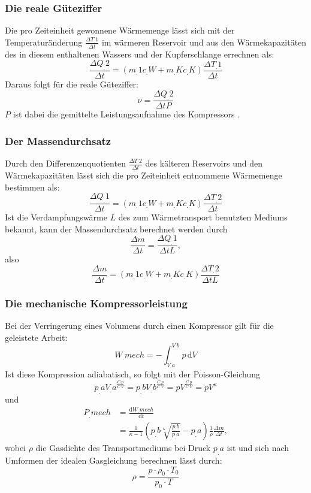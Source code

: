 \subsubsection{Die reale Güteziffer}
Die pro Zeiteinheit gewonnene Wärmemenge lässt sich mit der Temperaturänderung $\frac{\Delta T_.{1}}{\Delta t}$ im wärmeren Reservoir und aus den Wärmekapazitäten des in diesem enthaltenen Wassers und der Kupferschlange errechnen als\cite{V206}:
\begin{equation}
\frac{\Delta Q_.{2}}{\Delta t}=(m_.{1}c_.{W} +m_.{K}c_.{K})\frac{\Delta T_.{1}}{\Delta t}\label{eq:Q2/dt}
\end{equation}
Daraus folgt für die reale Güteziffer:
\begin{equation}
\nu = \frac{\Delta Q_.{2}}{\Delta t P}\label{eq:ny}
\end{equation}
$P$ ist dabei die gemittelte Leistungsaufnahme des Kompressors \cite{V206}.
\subsubsection{Der Massendurchsatz}
Durch den Differenzenquotienten $\frac{\Delta T_.{2}}{\Delta t}$
des kälteren Reservoirs und den Wärmekapazitäten lässt sich die pro Zeiteinheit entnommene Wärmemenge bestimmen als\cite{V206}:
\[\frac{\Delta Q_.{1}}{\Delta t}=(m_.{1}c_.{W} +m_.{K}c_.{K})\frac{\Delta T_.{2}}{\Delta t}\]
Ist die Verdampfungswärme $L$ des zum Wärmetransport benutzten Mediums bekannt, kann der Massendurchsatz berechnet werden durch
\begin{equation*}
\frac{\Delta m}{\Delta t} = \frac{\Delta Q_.{1}}{\Delta t L},\label{eq:Md1}
\end{equation*}
also
\begin{equation}
\frac{\Delta m}{\Delta t} = (m_.{1}c_.{W} +m_.{K}c_.{K})\frac{\Delta T_.{2}}{\Delta t L} \label{eq:Md2}
\end{equation}
\subsubsection{Die mechanische Kompressorleistung}
Bei der Verringerung eines Volumens durch einen Kompressor gilt für die geleistete Arbeit:
\[W_.{mech}= - \int_{V_.{a}}^{V_.{b}} p\,\mathrm{d}V\]
Ist diese Kompression adiabatisch, so folgt mit der Poisson-Gleichung
\[p_.{a}V_.{a}^{\frac{C_.{p}}{C_.{V}}} = p_.{b}V_.{b}^{\frac{C_.{p}}{C_.{V}}} = pV^{\frac{C_.{p}}{C_.{V}}} =pV^{\kappa}\]
und
\begin{align}
P_.{mech} 	&= \frac{\mathrm{d}W_.{mech}}{\mathrm{d}t} \nonumber\\
			&= \frac{1}{\kappa - 1}\left(p_.{b}\sqrt[\kappa]{\frac{p_.{b}}{p_.{a}}} - p_.{a}\right)\frac{1}{\rho}\frac{\Delta m}{\Delta t},\label{eq:P}
\end{align}
wobei $\rho$ die Gasdichte des Transportmediums bei Druck $p_.{a}$ ist und sich nach Umformen der idealen Gasgleichung berechnen lässt durch:
\begin{equation}
	\rho = \frac{p\cdot \rho_0\cdot T_0}{p_0\cdot T}\label{eq:rho}
\end{equation}